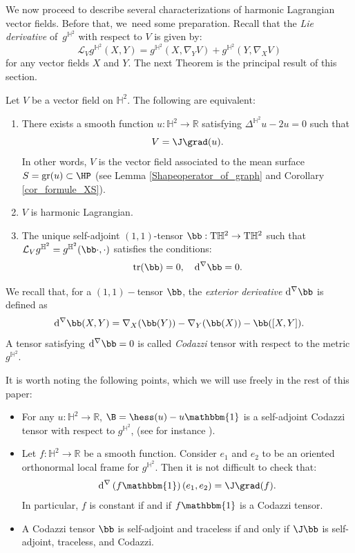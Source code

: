 We now proceed to describe several characterizations of harmonic Lagrangian vector fields. Before that, we~need some preparation.
Recall that the \emph{Lie derivative} of~$g^{\mathbb{H}^2}$ with respect to $V$ is given by:
\[
\mathcal{L}_Vg^{\mathbb{H}^2}(X,Y)=g^{\mathbb{H}^2}(X,\nabla_YV)+g^{\mathbb{H}^2}(Y,\nabla_X V)
\]
for any vector fields $X$ and $Y$.
The next Theorem is the principal result of this section.
\begin{theorem}\label{charac_HL}
Let $V$ be a vector field on $\mathbb{H}^2$. The following are equivalent:
\begin{enumerate}
\item \label{charac_HL1} There exists a smooth function $u:\mathbb{H}^2\to\mathbb{R}$ satisfying $\Delta^{\mathbb{H}^2} u-2u=0$ such that
\[
V=\J\grad(u).
\]
In other words, $V$ is the vector field associated to the mean surface $S=\mathrm{gr}(u)\subset\HP$ (see Lemma \ref{Shapeoperator_of_graph} and Corollary \ref{cor_formule_XS}).
\item \label{charac_HL2} $V$ is harmonic Lagrangian.
\item \label{charac_HL3} The unique self-adjoint $(1, 1)$-tensor $\bb:\mathrm{T}\mathbb{H}^2\to \mathrm{T}\mathbb{H}^2$ such that $\mathcal{L}_Vg^{\mathbb{H}^2}=g^{\mathbb{H}^2}(\bb\cdot,\cdot)$ satisfies the conditions:\begin{equation}\label{condition_harmonic_lagrangian}
\mathrm{tr}(\bb)=0,\quad \mathrm{d}^{\nabla}\bb=0.
\end{equation}
\end{enumerate}
\end{theorem}
We recall that, for a $(1,1)-$tensor $\bb$, the \emph{exterior derivative} $\mathrm{d}^{\nabla}\bb$ is defined as
\[
\mathrm{d}^{\nabla}\bb(X,Y) = \nabla_X(\bb(Y)) -\nabla_Y(\bb(X))-\bb([X, Y]).
\]
A tensor satisfying $\mathrm{d}^{\nabla}\bb=0$ is called \emph{Codazzi} tensor with respect to the metric $g^{\mathbb{H}^2}$.
\begin{remark}\label{remark_on_codazzi}
It is worth noting the following points, which we will use freely in the rest of this paper:
\begin{itemize}
\item For any $u:\mathbb{H}^2\to\mathbb{R}$, $\B=\hess(u)-u\mathbbm{1}$ is a self-adjoint Codazzi tensor with respect to $g^{\mathbb{H}^2}$, (see for instance \cite[Lem.\,2.1]{BS_flat_conical}).
\item Let $f:\mathbb{H}^2\to\mathbb{R}$ be a smooth function. Consider $e_1$ and $e_2$ to be an oriented orthonormal local frame
for $g^{\mathbb{H}^2}$. Then it is not difficult to check that:
\[
\mathrm{d}^{\nabla}\left(f\mathbbm{1} \right)(e_1,e_2)=\J\grad(f).
\]
In particular, $f$ is constant if and if $f\mathbbm{1}$ is a Codazzi tensor.

\item A Codazzi tensor $\bb$ is self-adjoint and traceless if and only if $\J\bb$ is self-adjoint, traceless, and Codazzi.
\end{itemize}
\end{remark}

